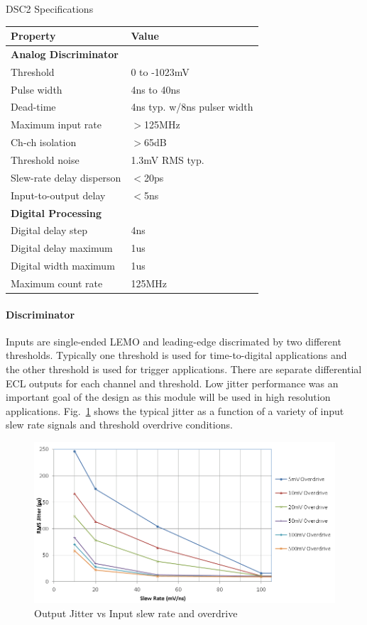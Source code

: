 \begin{center}
	DSC2 Specifications\\
	\begin{tabular}{| l | l |}
		\hline \hline
		Property			& Value				\\
		\hline
		{\bf Analog Discriminator}	&				\\
		Threshold			& 0 to -1023mV			\\
		Pulse width			& 4ns to 40ns			\\
		Dead-time			& 4ns typ. w/8ns pulser width	\\
		Maximum input rate		& $>$125MHz 			\\
		Ch-ch isolation			& $>$65dB			\\
		Threshold noise			& 1.3mV RMS typ.		\\
		Slew-rate delay disperson	& $<$20ps			\\
		Input-to-output delay		& $<$5ns			\\
		{\bf Digital Processing}	&				\\
		Digital delay step		& 4ns				\\
		Digital delay maximum		& 1us				\\
		Digital width maximum		& 1us				\\
		Maximum count rate		& 125MHz			\\
		\hline \hline
	\end{tabular}
\end{center}

\paragraph{Discriminator}
Inputs are single-ended LEMO and leading-edge discrimated by two different thresholds. Typically one threshold is used for time-to-digital applications and the other threshold is used for trigger applications. There are separate differential ECL outputs for each channel and threshold. Low jitter performance was an important goal of the design as this module will be used in high resolution applications. Fig.~\ref{fig:dsc2_jitter} shows the typical jitter as a function of a variety of input slew rate signals and threshold overdrive conditions.

\begin{figure}[hbt]
	\centering
	\includegraphics[width=1.0\columnwidth,keepaspectratio]{img/dsc2_jitter.png}
	\caption{Output Jitter vs Input slew rate and overdrive}
	\label{fig:dsc2_jitter}
\end{figure}

